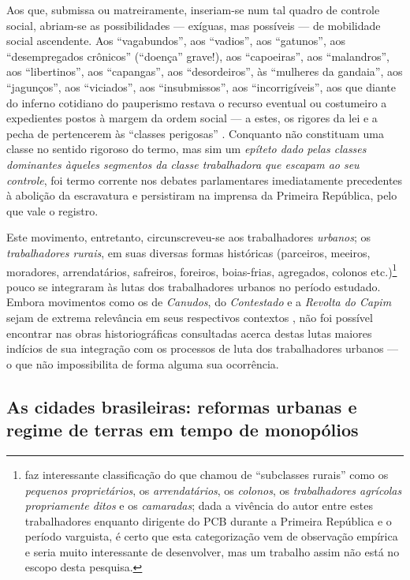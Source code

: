 Aos que, submissa ou matreiramente, inseriam-se num tal quadro de controle social, abriam-se as possibilidades --- exíguas, mas possíveis --- de mobilidade social ascendente. Aos ``vagabundos'', aos ``vadios'', aos ``gatunos'', aos ``desempregados crônicos'' (``doença'' grave!), aos ``capoeiras'', aos ``malandros'', aos ``libertinos'', aos ``capangas'', aos ``desordeiros'', às ``mulheres da gandaia'', aos ``jagunços'', aos ``viciados'', aos ``insubmissos'', aos ``incorrigíveis'', aos que diante do inferno cotidiano do pauperismo restava o recurso eventual ou costumeiro a expedientes postos à margem da ordem social  --- a estes, os rigores da lei e a pecha de pertencerem às ``classes perigosas'' \cite{chalhoub_botequim_1986, guimaraes_classper_1981}. Conquanto não constituam uma classe no sentido rigoroso do termo, mas sim um \textit{epíteto dado pelas classes dominantes àqueles segmentos da classe trabalhadora que escapam ao seu controle}, foi termo corrente nos debates parlamentares imediatamente precedentes à abolição da escravatura e persistiram na imprensa da Primeira República, pelo que vale o registro. 

Este movimento, entretanto, circunscreveu-se aos trabalhadores \textit{urbanos}; os \textit{trabalhadores rurais}, em suas diversas formas históricas (parceiros, meeiros, moradores, arrendatários, safreiros, foreiros, boias-frias, agregados, colonos etc.)\footnote{ faz interessante classificação do que chamou de ``subclasses rurais'' como os \textit{pequenos proprietários}, os \textit{arrendatários}, os \textit{colonos}, os \textit{trabalhadores agrícolas propriamente ditos} e os \textit{camaradas}; dada a vivência do autor entre estes trabalhadores enquanto dirigente do PCB durante a Primeira República e o período varguista, é certo que esta categorização vem de observação empírica e seria muito interessante de desenvolver, mas um trabalho assim não está no escopo desta pesquisa.} pouco se integraram às lutas dos trabalhadores urbanos no período estudado. Embora movimentos como os de \textit{Canudos}, do \textit{Contestado} e a \textit{Revolta do Capim} sejam de extrema relevância em seus respectivos contextos \cite{mottazarth_rescamp1_2008}, não foi possível encontrar nas obras historiográficas consultadas acerca destas lutas maiores indícios de sua integração com os processos de luta dos trabalhadores urbanos --- o que não impossibilita de forma alguma sua ocorrência.

\subsection{As cidades brasileiras: reformas urbanas e regime de terras em tempo de monopólios}\label{subsec:cidbraref}

